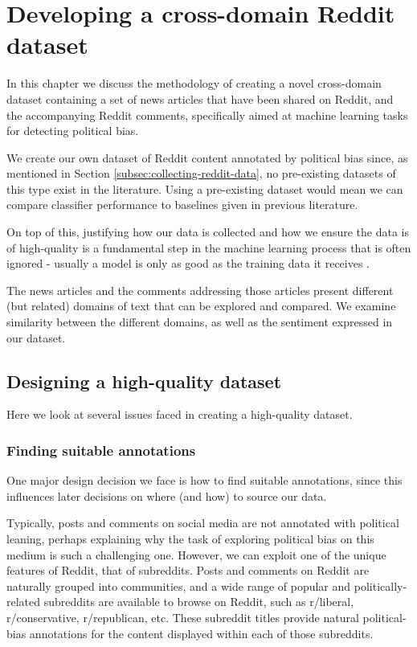 \chapter{Developing a cross-domain Reddit dataset} \label{chap:reddit-data}

In this chapter we discuss the methodology of creating a novel cross-domain dataset containing a set of news articles that have been shared on Reddit, and the accompanying Reddit comments, specifically aimed at machine learning tasks for detecting political bias.


We create our own dataset of Reddit content annotated by political bias since, as mentioned in Section \ref{subsec:collecting-reddit-data}, no pre-existing datasets of this type exist in the literature. Using a pre-existing dataset would mean we can compare classifier performance to baselines given in previous literature.

On top of this, justifying how our data is collected and how we ensure the data is of high-quality is a fundamental step in the machine learning process that is often ignored - usually a model is only as good as the training data it receives \cite{ilyas}.

The news articles and the comments addressing those articles present different (but related) domains of text that can be explored and compared. We examine similarity between the different domains, as well as the sentiment expressed in our dataset.

\section{Designing a high-quality dataset}

Here we look at several issues faced in creating a high-quality dataset.

\subsection{Finding suitable annotations} \label{subsec:annotations}

One major design decision we face is how to find suitable annotations, since this influences later decisions on where (and how) to source our data.

Typically, posts and comments on social media are not annotated with political leaning, perhaps explaining why the task of exploring political bias on this medium is such a challenging one. However, we can exploit one of the unique features of Reddit, that of subreddits. Posts and comments on Reddit are naturally grouped into communities, and a wide range of popular and politically-related subreddits are available to browse on Reddit, such as r/liberal, r/conservative, r/republican, etc. These subreddit titles provide natural political-bias annotations for the content displayed within each of those subreddits.

